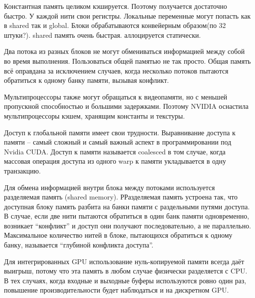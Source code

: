 \documentclass[a4paper,14pt,russian]{extreport}
\begin{document}
\par
Константная память целиком кэшируется. Поэтому получается достаточно быстро. У каждой нити свои регистры. Локальные переменные могут попасть как в shared так и global. Блоки обрабатываются конвейерным образом(по 32 штуки?). shared память очень быстрая. аллоцируется статически. 
\par 
Два потока из разных блоков не могут обмениваться информацией между собой во время выполнения. Пользоваться общей памятью не так просто. Общая память всё оправдана за исключением случаев, когда несколько потоков пытаются обратиться к одному банку памяти, вызывая конфликт. 
\par 
Мультипроцессоры также могут обращаться к видеопамяти, но с меньшей пропускной способностью и большими задержками. Поэтому NVIDIA оснастила мультипроцессоры кэшем, хранящим константы и текстуры. 
\par 
Доступ к глобальной памяти имеет свои трудности. Выравнивание доступа к памяти – самый сложный и самый важный аспект в программировании под Nvidia CUDA. Доступ к памяти называется coalesced в том случае, когда массовая операция доступа из одного warp к памяти укладывается в одну транзакцию.
\par 
Для обмена информацией внутри блока между потоками используется разделяемая память (shared memory). РРазделяемая память устроена так, что доступная блоку память разбита на банки памяти с раздельными путями доступа. В случае, если две нити пытаются обратиться в один банк памяти одновременно, возникает “конфликт” и доступ они получают последовательно, а не параллельно. Максимальное количество нитей в блоке, пытающихся обратиться к одному банку, называется “глубиной конфликта доступа”.
\par 
Для интегрированных GPU использование нуль-копируемой памяти всегда даёт выигрыш, потому что эта память в любом случае физически разделяется с CPU. В тех случаях, когда входные и выходные буферы используются ровно один раз, повышение производительности будет наблюдаться и на дискретном GPU.
\end{document}
